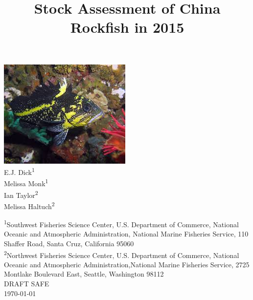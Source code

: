 \documentclass[12pt,]{article}
\title{Stock Assessment of China Rockfish in 2015}
\author{}
\date{}
\begin{document}
\maketitle



\begin{center}
\thispagestyle{empty}

\vspace{2cm}

\includegraphics{chinarockfish}~\\[1cm]



E.J. Dick\textsuperscript{1}\\
Melissa Monk\textsuperscript{1}\\
Ian Taylor\textsuperscript{2}\\
Melissa Haltuch\textsuperscript{2}\\

\vspace{1cm}


\textsuperscript{1}Southwest Fisheries Science Center, U.S. Department of Commerce, National Oceanic and Atmospheric Administration, National Marine Fisheries Service, 110 Shaffer Road, Santa Cruz, California 95060\\

\textsuperscript{2}Northwest Fisheries Science Center, U.S. Department of Commerce, National Oceanic and Atmospheric Administration,National Marine Fisheries Service, 2725 Montlake Boulevard East, Seattle, Washington 98112\\

\vfill
\textsc{\Large DRAFT SAFE}\\[0.5cm]
{\large \today}

\maketitle

\setcounter{page}{1}
\end{center}
\end{document}
